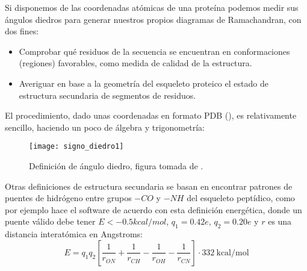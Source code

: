 Si disponemos de las coordenadas at\'{o}micas de una prote\'{i}na podemos medir sus \'{a}ngulos diedros 
para generar nuestros propios diagramas de Ramachandran, 
con dos fines:
\begin{itemize}
\item Comprobar qu\'{e} residuos de la secuencia se encuentran en conformaciones (regiones) favorables, como medida de calidad
de la estructura. 
\item Averiguar en base a la geometr\'{i}a del esqueleto proteico el estado de estructura secundaria de segmentos de residuos.
\end{itemize}

El procedimiento, dado unas coordenadas en formato PDB 
(),
es relativamente sencillo, 
haciendo un poco de \'{a}lgebra y trigonometr\'{i}a:


\begin{figure}
\begin{center} 
\texttt{[image: signo\_diedro1]}
\caption%
{
Definici\'{o}n de \'{a}ngulo diedro, 
figura tomada de .
}
\label{fig:signo_diedro1}
\end{center}
\end{figure}


Otras definiciones de estructura secundaria se basan en encontrar patrones de puentes de 
hidr\'{o}geno entre grupos $-CO$ y $-NH$ del esqueleto pept\'{i}dico, 
como por ejemplo hace el software  \citep{Kabsch1983}
de acuerdo con esta definici\'{o}n energ\'{e}tica, donde un puente v\'{a}lido debe tener $E<-0{.}5 kcal/mol$, 
$q_{1}=0.42e$, $q_{2}=0.20e$ y $r$ es una distancia interat\'{o}mica en Angstroms:
\begin{equation}
E = q_{1} q_{2} \left[ \frac{1}{r_{ON}} + \frac{1}{r_{CH}} - \frac{1}{r_{OH}} - \frac{1}{r_{CN}} \right] \cdot 332 \ \mathrm{kcal/mol}
\label{eq:dssp}
\end{equation}


